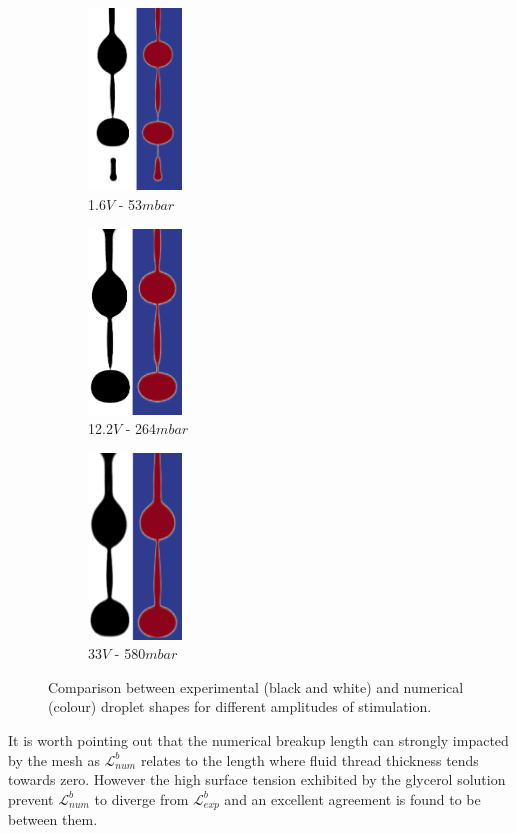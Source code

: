 \documentclass[twocolumn,10pt]{asme2ej}
\begin{document}
\begin{figure}[h]
    \centering
    \begin{subfigure}{2.7cm}
        \centering
        \includegraphics[width=2.5cm]{Glycerol/num_exp_053mbar_1.png}
        \caption{1.6$V$ - 53$mbar$}
    \end{subfigure}
    \hfill
    \begin{subfigure}{2.7cm}
        \centering
        \includegraphics[width=2.5cm]{Glycerol/num_exp_264mbar.png}
        \caption{12.2$V$ - 264$mbar$}
    \end{subfigure}
    \hfill
    \begin{subfigure}{2.7cm}
        \centering
        \includegraphics[width=2.5cm]{Glycerol/num_exp_580mbar_1.png}
        \caption{33$V$ - 580$mbar$}
    \end{subfigure}
       \caption{Comparison between experimental (black and white) and numerical (colour) droplet shapes for different amplitudes of stimulation.}
       \label{fig:glycerolDrop}
\end{figure}
It is worth pointing out that the numerical breakup length can strongly impacted by the mesh as $\mathcal{L}_{num}^b$ relates to the length where fluid thread thickness tends towards zero. However the high surface tension exhibited by the glycerol solution prevent $\mathcal{L}_{num}^b$ to diverge from $\mathcal{L}_{exp}^b$ and an excellent agreement is found to be between them. 
\end{document}
